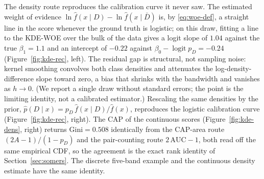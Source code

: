 \documentclass[12pt]{article}
\newcommand{\pD}{p_D}
\begin{document}
The density route reproduces the calibration curve it never saw. The estimated weight of
evidence $\ln\hat f(x\mid D)-\ln\hat f(x\mid\bar D)$ is, by \eqref{eq:woe-def}, a straight line
in the score whenever the ground truth is logistic; on this draw, fitting a line to the KDE-WOE over
the bulk of the data gives a logit slope of $1.04$ against the true $\beta_1=1.1$ and an
intercept of $-0.22$ against $\beta_0-\operatorname{logit}\pD=-0.24$ (Figure~\ref{fig:kde-rec},
left). The residual gap is structural, not sampling noise: kernel smoothing convolves both
class densities and attenuates the log-density-difference slope toward zero, a bias that shrinks with the
bandwidth and vanishes as $h\to0$. (We report a single draw without standard errors; the point
is the limiting identity, not a calibrated estimator.) Rescaling the same densities by the
prior, $\hat p(D\mid x)=\pD\,\hat f(x\mid D)/\hat f(x)$, reproduces the logistic calibration
curve (Figure~\ref{fig:kde-rec}, right). The CAP of the continuous scores
(Figure~\ref{fig:kde-dens}, right) returns $\mathrm{Gini}=0.508$ identically from the CAP-area
route $(2A-1)/(1-\pD)$ and the pair-counting route $2\,\mathrm{AUC}-1$, both read off the
same empirical CDF, so the agreement is the exact rank identity of Section~\ref{sec:somers}.
The discrete five-band example and the continuous density estimate have the same identity.
\end{document}

